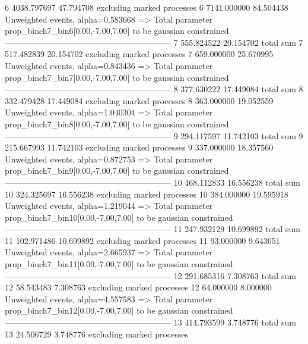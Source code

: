 6          4038.797697     47.794708       excluding marked processes    
6          7141.000000     84.504438       Unweighted events, alpha=0.583668
  => Total parameter prop_binch7_bin6[0.00,-7.00,7.00] to be gaussian constrained
------------------------------------------------------------
7          555.824522      20.154702       total sum                     
7          517.482839      20.154702       excluding marked processes    
7          659.000000      25.670995       Unweighted events, alpha=0.843436
  => Total parameter prop_binch7_bin7[0.00,-7.00,7.00] to be gaussian constrained
------------------------------------------------------------
8          377.630222      17.449084       total sum                     
8          332.479428      17.449084       excluding marked processes    
8          363.000000      19.052559       Unweighted events, alpha=1.040304
  => Total parameter prop_binch7_bin8[0.00,-7.00,7.00] to be gaussian constrained
------------------------------------------------------------
9          294.117597      11.742103       total sum                     
9          215.667993      11.742103       excluding marked processes    
9          337.000000      18.357560       Unweighted events, alpha=0.872753
  => Total parameter prop_binch7_bin9[0.00,-7.00,7.00] to be gaussian constrained
------------------------------------------------------------
10         468.112833      16.556238       total sum                     
10         324.325697      16.556238       excluding marked processes    
10         384.000000      19.595918       Unweighted events, alpha=1.219044
  => Total parameter prop_binch7_bin10[0.00,-7.00,7.00] to be gaussian constrained
------------------------------------------------------------
11         247.932129      10.699892       total sum                     
11         102.971486      10.699892       excluding marked processes    
11         93.000000       9.643651        Unweighted events, alpha=2.665937
  => Total parameter prop_binch7_bin11[0.00,-7.00,7.00] to be gaussian constrained
------------------------------------------------------------
12         291.685316      7.308763        total sum                     
12         58.543483       7.308763        excluding marked processes    
12         64.000000       8.000000        Unweighted events, alpha=4.557583
  => Total parameter prop_binch7_bin12[0.00,-7.00,7.00] to be gaussian constrained
------------------------------------------------------------
13         414.793599      3.748776        total sum                     
13         24.506729       3.748776        excluding marked processes    
